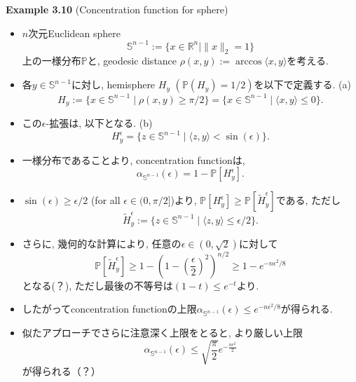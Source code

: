 \documentclass[aspectratio=169, dvipdfmx]{beamer}
\begin{document}
\begin{frame}{}{}
{\bf Example 3.10} (Concentration function for sphere)
\begin{itemize}
    \item $n$次元Euclidean sphere
    \[
        \mathbb{S}^{n-1} := \{x\in \mathbb{R}^n\mid \|x\|_2=1\}
        \tag{3.29}\label{3.29}
    \]
    上の一様分布$\mathbb{P}$と,
    geodesic distance $\rho(x, y):=\arccos\langle x,y\rangle$を考える.
    \item 各$y\in\mathbb{S}^{n-1}$に対し, hemisphere $H_y$ $(\mathbb{P}(H_y)=1/2)$を以下で定義する. (a)
    \[
        H_y
        := \{x\in \mathbb{S}^{n-1}\mid \rho(x,y) \ge \pi/2\}
        = \{ x \in \mathbb{S}^{n-1} \mid \langle x, y\rangle \le 0 \}.
        \tag{3.30}\label{3.30}
    \]
    \item この$\epsilon$-拡張は, 以下となる. (b)
    \[
        H_y^\epsilon = \{z\in \mathbb{S}^{n-1} \mid \langle z, y \rangle < \sin(\epsilon)\}.
        \tag{3.31}\label{3.31}
    \]
\end{itemize}
\end{frame}

\begin{frame}{}{}
\begin{itemize}
    \item 一様分布であることより, concentration functionは, 
    \[
        \alpha_{\mathbb{S}^{n-1}}(\epsilon) = 1 - \mathbb{P}[H_y^\epsilon].
        \tag{3.32}\label{3.32}
    \]
    \item $\sin(\epsilon) \ge \epsilon/2$ (for all $\epsilon\in (0,\pi/2]$)より,
    $\mathbb{P}[H_y^\epsilon] \ge \mathbb{P}[\tilde{H}_y^\epsilon]$である, ただし
    \[
        \tilde{H}_y^\epsilon
        := \{z\in \mathbb{S}^{n-1} \mid \langle z, y\rangle \le \epsilon/2\}.
    \]
    \item さらに, 幾何的な計算により, 任意の$\epsilon \in (0, \sqrt{2})$に対して
    \[
        \mathbb{P}[\tilde{H}_y^\epsilon]
        \ge 1 - \left(1-\left(\frac{\epsilon}{2}\right)^2\right)^{n/2}
        \ge 1 - e^{-n\epsilon^2/8}
        \tag{3.33}\label{3.33}
    \]
    となる(？), ただし最後の不等号は$(1-t)\le e^{-t}$より.
    \item したがってconcentration functionの上限$\alpha_{\mathbb{S}^{n-1}}(\epsilon) \le e^{-n\epsilon^2/8}$が得られる.
    \item 似たアプローチでさらに注意深く上限をとると, より厳しい上限
    \[
        \alpha_{\mathbb{S}^{n-1}}(\epsilon) \le \sqrt{\frac{\pi}{2}}e^{-\frac{n\epsilon^2}{2}}
        \tag{3.34}\label{3.34}
    \]
    が得られる（？）
\end{itemize}
\end{frame}
\end{document}
